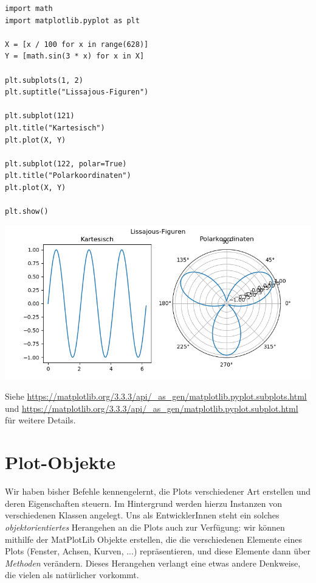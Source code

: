 \begin{codebox}
\begin{verbatim}
import math
import matplotlib.pyplot as plt

X = [x / 100 for x in range(628)]
Y = [math.sin(3 * x) for x in X]

plt.subplots(1, 2)
plt.suptitle("Lissajous-Figuren")

plt.subplot(121)
plt.title("Kartesisch")
plt.plot(X, Y)

plt.subplot(122, polar=True)
plt.title("Polarkoordinaten")
plt.plot(X, Y)

plt.show()
\end{verbatim}
\end{codebox}
%
\begin{tcolorbox}[title=Ausgabe: Lissajous-Figuren]
\begin{center}
	\includegraphics[width=\linewidth]{./gfx/plt-Lissajous}
	\label{fig:plt-Lissajous}
\end{center}
\end{tcolorbox}

Siehe \url{https://matplotlib.org/3.3.3/api/_as_gen/matplotlib.pyplot.subplots.html} und \url{https://matplotlib.org/3.3.3/api/_as_gen/matplotlib.pyplot.subplot.html} für weitere Details.

\section{Plot-Objekte}
Wir haben bisher Befehle kennengelernt, die Plots verschiedener Art erstellen und deren Eigenschaften steuern. Im Hintergrund werden hierzu Instanzen von verschiedenen Klassen angelegt. Uns als EntwicklerInnen steht ein solches \emph{objektorientiertes} Herangehen an die Plots auch zur Verfügung: wir können mithilfe der MatPlotLib Objekte erstellen, die die verschiedenen Elemente eines Plots (Fenster, Achsen, Kurven, ...) repräsentieren, und diese Elemente dann über \emph{Methoden} verändern. Dieses Herangehen verlangt eine etwas andere Denkweise, die vielen als natürlicher vorkommt.

